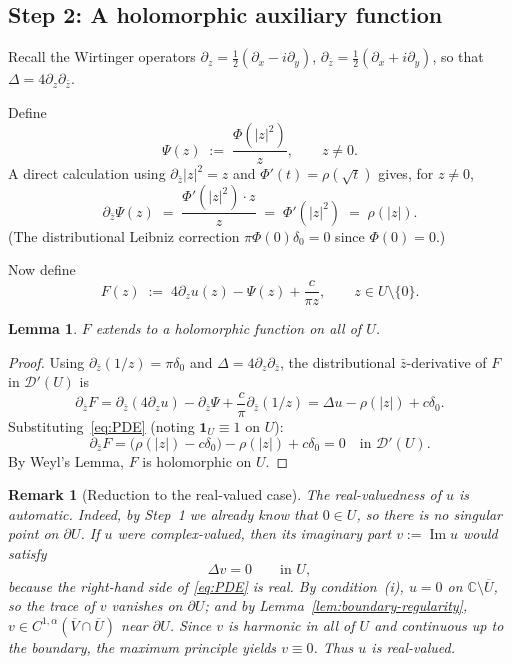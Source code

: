 \documentclass[11pt]{article}
\newtheorem{lemma}[theorem]{Lemma}
\newtheorem{remark}[theorem]{Remark}
\newcommand{\C}{\mathbb{C}}
\newcommand{\1}{\mathbf{1}}
\renewcommand{\Im}{\operatorname{Im}}
\begin{document}
\subsection*{Step 2: A holomorphic auxiliary function}

Recall the Wirtinger operators $\partial_z = \tfrac12(\partial_x - i\partial_y)$,
$\partial_{\bar z} = \tfrac12(\partial_x + i\partial_y)$, so that $\Delta = 4\partial_z\partial_{\bar z}$.

Define
\begin{equation}\label{eq:Psi}
  \Psi(z) \;:=\; \frac{\Phi(|z|^2)}{z}, \qquad z\neq 0.
\end{equation}
A direct calculation using $\partial_{\bar z}|z|^2=z$ and $\Phi'(t)=\rho(\sqrt{t})$ gives,
for $z\neq 0$,
\[
  \partial_{\bar z}\Psi(z)
  \;=\;
  \frac{\Phi'(|z|^2)\cdot z}{z}
  \;=\;
  \Phi'(|z|^2)
  \;=\;
  \rho(|z|).
\]
(The distributional Leibniz correction $\pi\Phi(0)\delta_0=0$ since $\Phi(0)=0$.)

Now define
\begin{equation}\label{eq:F}
  F(z) \;:=\; 4\partial_z u(z) - \Psi(z) + \frac{c}{\pi z}, \qquad z\in U\setminus\{0\}.
\end{equation}

\begin{lemma}\label{lem:holo}
  $F$ extends to a holomorphic function on all of $U$.
\end{lemma}

\begin{proof}
  Using $\partial_{\bar z}(1/z)=\pi\delta_0$ and $\Delta=4\partial_z\partial_{\bar z}$, the
  distributional $\bar z$-derivative of $F$ in $\mathcal D'(U)$ is
  \[
    \partial_{\bar z} F
    = \partial_{\bar z}(4\partial_z u) - \partial_{\bar z}\Psi
      + \frac{c}{\pi}\partial_{\bar z}(1/z)
    = \Delta u - \rho(|z|) + c\delta_0.
  \]
  Substituting~\eqref{eq:PDE} (noting $\1_U\equiv 1$ on $U$):
  \[
    \partial_{\bar z} F
    = \bigl(\rho(|z|) - c\delta_0\bigr) - \rho(|z|) + c\delta_0
    = 0
    \quad \text{in }\mathcal D'(U).
  \]
  By Weyl's Lemma, $F$ is holomorphic on $U$.
\end{proof}

\begin{remark}[Reduction to the real-valued case]\label{rem:real}
  The real-valuedness of $u$ is automatic.  Indeed, by Step~1 we already know that $0\in U$, so
  there is no singular point on $\partial U$.  If $u$ were complex-valued, then its imaginary
  part $v:=\Im u$ would satisfy
  \[
    \Delta v=0 \qquad\text{in }U,
  \]
  because the right-hand side of \eqref{eq:PDE} is real.  By condition~(i), \(u=0\) on
  \(\C\setminus\overline U\), so the trace of \(v\) vanishes on \(\partial U\); and by
  Lemma~\ref{lem:boundary-regularity}, \(v\in C^{1,\alpha}(\overline V\cap\overline U)\) near
  \(\partial U\).  Since \(v\) is harmonic in all of \(U\) and continuous up to the boundary,
  the maximum principle yields \(v\equiv 0\).  Thus \(u\) is real-valued.
\end{remark}
\end{document}
